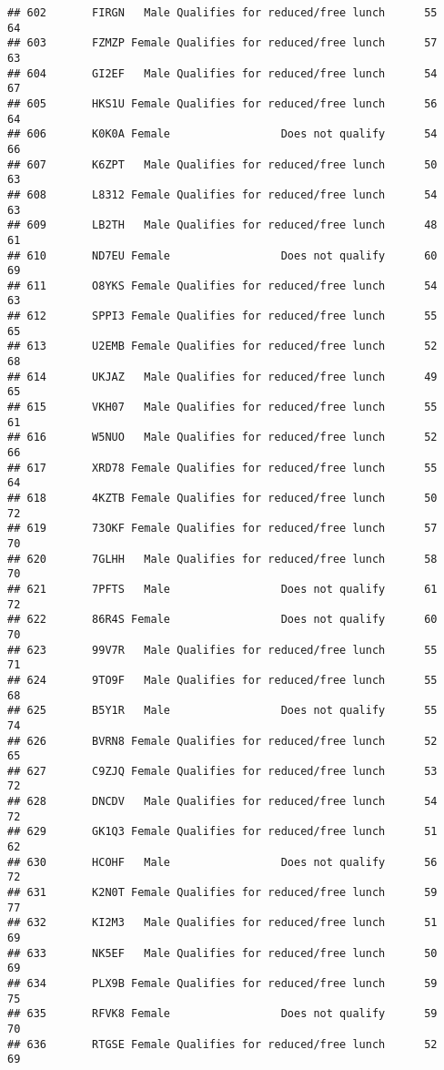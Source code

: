 \documentclass[
]{article}
\begin{document}
\begin{verbatim}
## 602       FIRGN   Male Qualifies for reduced/free lunch      55       64
## 603       FZMZP Female Qualifies for reduced/free lunch      57       63
## 604       GI2EF   Male Qualifies for reduced/free lunch      54       67
## 605       HKS1U Female Qualifies for reduced/free lunch      56       64
## 606       K0K0A Female                 Does not qualify      54       66
## 607       K6ZPT   Male Qualifies for reduced/free lunch      50       63
## 608       L8312 Female Qualifies for reduced/free lunch      54       63
## 609       LB2TH   Male Qualifies for reduced/free lunch      48       61
## 610       ND7EU Female                 Does not qualify      60       69
## 611       O8YKS Female Qualifies for reduced/free lunch      54       63
## 612       SPPI3 Female Qualifies for reduced/free lunch      55       65
## 613       U2EMB Female Qualifies for reduced/free lunch      52       68
## 614       UKJAZ   Male Qualifies for reduced/free lunch      49       65
## 615       VKH07   Male Qualifies for reduced/free lunch      55       61
## 616       W5NUO   Male Qualifies for reduced/free lunch      52       66
## 617       XRD78 Female Qualifies for reduced/free lunch      55       64
## 618       4KZTB Female Qualifies for reduced/free lunch      50       72
## 619       73OKF Female Qualifies for reduced/free lunch      57       70
## 620       7GLHH   Male Qualifies for reduced/free lunch      58       70
## 621       7PFTS   Male                 Does not qualify      61       72
## 622       86R4S Female                 Does not qualify      60       70
## 623       99V7R   Male Qualifies for reduced/free lunch      55       71
## 624       9TO9F   Male Qualifies for reduced/free lunch      55       68
## 625       B5Y1R   Male                 Does not qualify      55       74
## 626       BVRN8 Female Qualifies for reduced/free lunch      52       65
## 627       C9ZJQ Female Qualifies for reduced/free lunch      53       72
## 628       DNCDV   Male Qualifies for reduced/free lunch      54       72
## 629       GK1Q3 Female Qualifies for reduced/free lunch      51       62
## 630       HCOHF   Male                 Does not qualify      56       72
## 631       K2N0T Female Qualifies for reduced/free lunch      59       77
## 632       KI2M3   Male Qualifies for reduced/free lunch      51       69
## 633       NK5EF   Male Qualifies for reduced/free lunch      50       69
## 634       PLX9B Female Qualifies for reduced/free lunch      59       75
## 635       RFVK8 Female                 Does not qualify      59       70
## 636       RTGSE Female Qualifies for reduced/free lunch      52       69

\end{verbatim}
\end{document}
